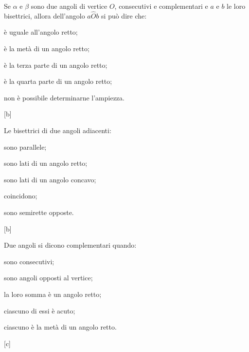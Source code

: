 \begin{esercizio}
\label{ese:1.68}
Se $\alpha$ e $\beta$ sono due angoli di vertice $O$, consecutivi e 
complementari e $a$ e $b$ le loro bisettrici, allora dell'angolo 
$a\widehat{O}b$ si può dire  che:
\begin{multicols}{2}
\begin{enumeratea}
\item è uguale all'angolo retto;
\item è la metà di un angolo retto;
\item è la terza parte di un angolo retto;
\item è la quarta parte di un angolo retto;
\item non è possibile determinarne l'ampiezza.
\end{enumeratea}
\end{multicols}
\hfill[b]
\end{esercizio}

\begin{esercizio}
\label{ese:1.69}
Le bisettrici di due angoli adiacenti:
\begin{multicols}{2}
\begin{enumeratea}
\item sono parallele;
\item sono lati di un angolo retto;
\item sono lati di un angolo concavo;
\item coincidono;
\item sono semirette opposte.
\end{enumeratea}
\end{multicols}
\hfill[b]
\end{esercizio}

\begin{esercizio}
\label{ese:1.70}
Due angoli si dicono complementari quando:
\begin{multicols}{2}
\begin{enumeratea}
\item sono consecutivi;
\item sono angoli opposti al vertice;
\item la loro somma è un angolo retto;
\item ciascuno di essi è acuto;
\item ciascuno è la metà di un angolo retto.
\end{enumeratea}
\end{multicols}
\hfill[c]
\end{esercizio}

